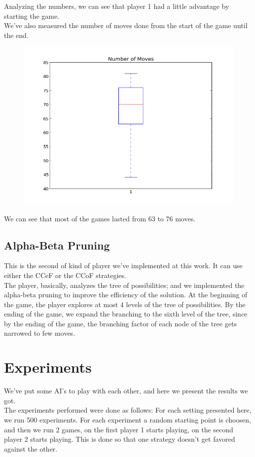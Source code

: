 \documentclass[10pt]{article}
\begin{document}
Analyzing the numbers, we can see that player 1 had a little advantage by starting the game.\\
We've also measured the number of moves done from the start of the game until the end.

\begin{figure}[H]
\centering
\includegraphics[scale=0.35]{img/n_moves_random.png}
\end{figure}

We can see that most of the games lasted from 63 to 76 moves.


\subsection{Alpha-Beta Pruning}
This is the second of kind of player we've implemented at this work. It can use either the CCeF or the CCoF strategies.\\
The player, basically, analyzes the tree of possibilities; and we implemented the alpha-beta pruning to improve the efficiency of the solution. At the beginning of the game, the player explores at most 4 levels of the tree of possibilities. By the ending of the game, we expand the branching to the sixth level of the tree, since by the ending of the game, the branching factor of each node of the tree gets narrowed to few moves.

\section{Experiments}

We've put some AI's to play with each other, and here we present the results we got.\\
The experiments performed were done as follows: For each setting presented here, we run 500 experiments. For each experiment a random starting point is choosen, and then we run 2 games, on the first player 1 starts playing, on the second player 2 starts playing. This is done so that one strategy doesn't get favored against the other.
\end{document}
